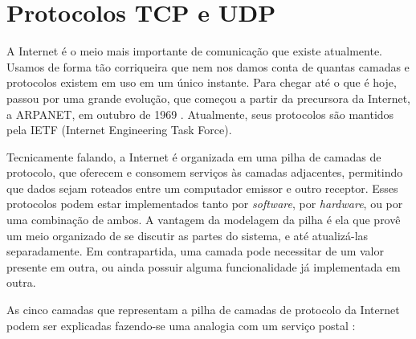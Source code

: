 
\section{Protocolos TCP e UDP}

A Internet é o meio mais importante de comunicação que existe atualmente. Usamos de
forma tão corriqueira que nem nos damos conta de quantas camadas e protocolos existem em
uso em um único instante. Para chegar até o que é hoje, passou por uma grande evolução,
que começou a partir da precursora da Internet, a ARPANET, em outubro de 1969
\cite{book:kurose}. Atualmente, seus protocolos são mantidos pela IETF (Internet
Engineering Task Force).

Tecnicamente falando, a Internet é organizada em uma pilha de camadas de protocolo, que
oferecem e consomem serviços às camadas adjacentes, permitindo que dados sejam roteados
entre um computador emissor e outro receptor. Esses protocolos podem estar implementados
tanto por \emph{software}, por \emph{hardware}, ou por uma combinação de ambos. A
vantagem da modelagem da pilha é ela que provê um meio organizado de se discutir as
partes do sistema, e até atualizá-las separadamente. Em contrapartida, uma camada pode
necessitar de um valor presente em outra, ou ainda possuir alguma funcionalidade já
implementada em outra.

As cinco camadas que representam a pilha de camadas de protocolo da Internet podem ser
explicadas fazendo-se uma analogia com um serviço postal \cite{site:internet-layer}:

